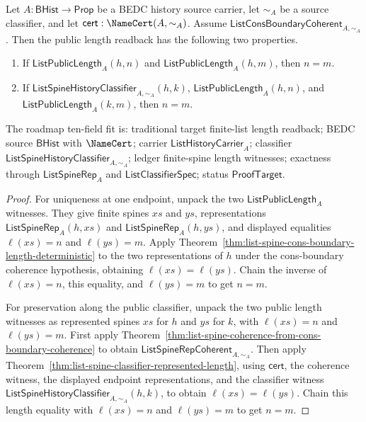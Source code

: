 \begin{theorem}
\label{thm:list-public-length-readback-well-defined}
Let $A:\mathsf{BHist}\to\mathsf{Prop}$ be a BEDC history source carrier, let
$\sim_A$ be a source classifier, and let
$\mathsf{cert}:\NameCert(A,\sim_A)$. Assume
$\mathsf{ListConsBoundaryCoherent}_{A,\sim_A}$. Then the public length readback
has the following two properties.
\begin{enumerate}
  \item If $\mathsf{ListPublicLength}_A(h,n)$ and
  $\mathsf{ListPublicLength}_A(h,m)$, then $n=m$.
  \item If $\mathsf{ListSpineHistoryClassifier}_{A,\sim_A}(h,k)$,
  $\mathsf{ListPublicLength}_A(h,n)$, and
  $\mathsf{ListPublicLength}_A(k,m)$, then $n=m$.
\end{enumerate}
The roadmap ten-field fit is: traditional target finite-list length readback;
BEDC source $\mathsf{BHist}$ with $\NameCert$; carrier
$\mathsf{ListHistoryCarrier}_A$; classifier
$\mathsf{ListSpineHistoryClassifier}_{A,\sim_A}$; ledger finite-spine length
witnesses; exactness through $\mathsf{ListSpineRep}_A$ and
$\mathsf{ListClassifierSpec}$; status $\mathsf{ProofTarget}$.
\end{theorem}
\begin{proof}
For uniqueness at one endpoint, unpack the two
$\mathsf{ListPublicLength}_A$ witnesses. They give finite spines $xs$ and $ys$,
representations $\mathsf{ListSpineRep}_A(h,xs)$ and
$\mathsf{ListSpineRep}_A(h,ys)$, and displayed equalities
$\ell(xs)=n$ and $\ell(ys)=m$. Apply
Theorem~\ref{thm:list-spine-cons-boundary-length-deterministic} to the two
representations of $h$ under the cons-boundary coherence hypothesis, obtaining
$\ell(xs)=\ell(ys)$. Chain the inverse of $\ell(xs)=n$, this equality, and
$\ell(ys)=m$ to get $n=m$.

For preservation along the public classifier, unpack the two public length
witnesses as represented spines $xs$ for $h$ and $ys$ for $k$, with
$\ell(xs)=n$ and $\ell(ys)=m$. First apply
Theorem~\ref{thm:list-spine-coherence-from-cons-boundary-coherence} to obtain
$\mathsf{ListSpineRepCoherent}_{A,\sim_A}$. Then apply
Theorem~\ref{thm:list-spine-classifier-represented-length}, using
$\mathsf{cert}$, the coherence witness, the displayed endpoint
representations, and the classifier witness
$\mathsf{ListSpineHistoryClassifier}_{A,\sim_A}(h,k)$, to obtain
$\ell(xs)=\ell(ys)$. Chain this length equality with $\ell(xs)=n$ and
$\ell(ys)=m$ to get $n=m$.
\end{proof}

